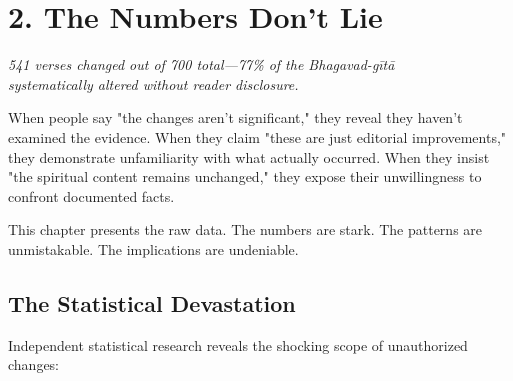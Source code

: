 \documentclass[11pt,twoside]{book}
\begin{document}
\chapter*{2. The Numbers Don't Lie}
\label{sec:org1f56b70}

{\centering\itshape 541 verses changed out of 700 total—77\% of the Bhagavad-gītā\\systematically altered without reader disclosure.\par}
\vspace{0.3cm}

\normalfont\justifying
When people say "the changes aren't significant," they reveal they haven't examined the evidence. When they claim "these are just editorial improvements," they demonstrate unfamiliarity with what actually occurred. When they insist "the spiritual content remains unchanged," they expose their unwillingness to confront documented facts.

This chapter presents the raw data. The numbers are stark. The patterns are unmistakable. The implications are undeniable.

\vfill
\section*{The Statistical Devastation}
\label{sec:orgbdcea31}

Independent statistical research reveals the shocking scope of unauthorized changes:
\end{document}
